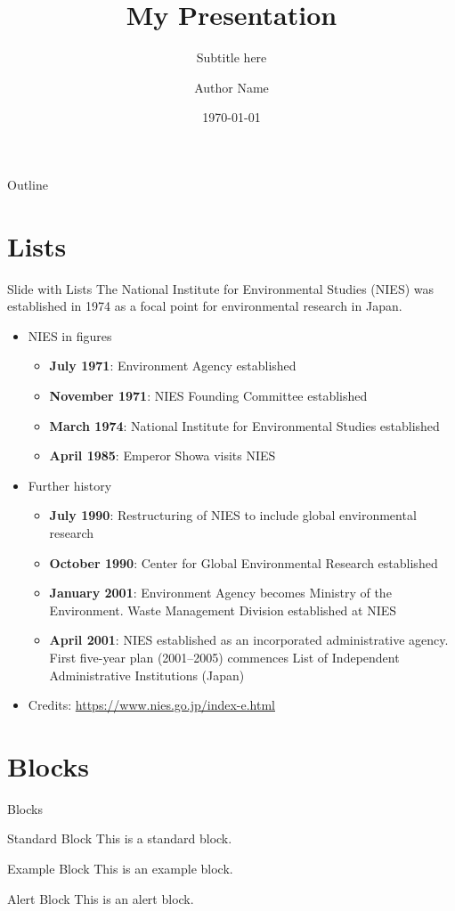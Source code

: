 \documentclass[aspectratio=169,t]{beamer}
\title{My Presentation}
\subtitle{Subtitle here}
\author{Author Name}
\institute{Affiliation(s)}
\date{\today}
\begin{document}
\titleframe

\begin{frame}[t]{Outline}
	\tableofcontents
\end{frame}

\section{Lists}
\begin{frame}[t]{Slide with Lists}
The National Institute for Environmental Studies (NIES) was established in 1974 as a focal point for environmental research in Japan.
	\begin{itemize}
		\item NIES in figures
			\begin{itemize}
				\item \textbf{July 1971}: Environment Agency established
				\item \textbf{November 1971}: NIES Founding Committee established
				\item \textbf{March 1974}: National Institute for Environmental Studies established
				\item \textbf{April 1985}: Emperor Showa visits NIES
			\end{itemize}
		\item Further history
			\begin{itemize}
				\item \textbf{July 1990}: Restructuring of NIES to include global environmental research
				\item \textbf{October 1990}: Center for Global Environmental Research established
				\item \textbf{January 2001}: Environment Agency becomes Ministry of the Environment. Waste Management Division established at NIES
				\item \textbf{April 2001}: NIES established as an incorporated administrative agency. First five-year plan (2001–2005) commences List of Independent Administrative Institutions (Japan)
			\end{itemize}
		\item Credits: \url{https://www.nies.go.jp/index-e.html}
	\end{itemize}
\end{frame}

\section{Blocks}
\begin{frame}[t]{Blocks}
	\begin{block}{Standard Block}
		This is a standard block.
	\end{block}
	
	\begin{exampleblock}{Example Block}
		This is an example block.
	\end{exampleblock}
	
	\begin{alertblock}{Alert Block}
		This is an alert block.
	\end{alertblock}
\end{frame}
\end{document}
